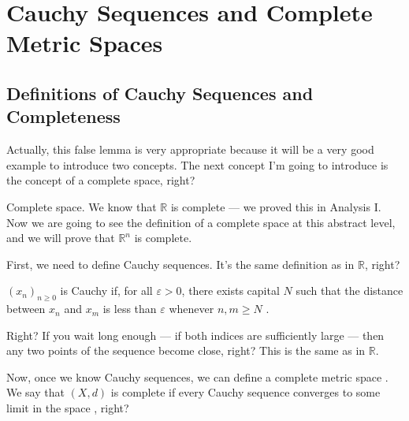 \section{Cauchy Sequences and Complete Metric Spaces}

\subsection{Definitions of Cauchy Sequences and Completeness}

\begin{speech}[00:49:59 - 00:51:39]
Actually, this false lemma is very appropriate because it will be a very good example to introduce two concepts. The next concept I'm going to introduce is the concept of a complete space, right?

Complete space. We know that $\mathbb{R}$ is complete --- we proved this in Analysis I. Now we are going to see the definition of a complete space at this abstract level, and we will prove that $\mathbb{R}^n$ is complete.

First, we need to define Cauchy sequences.  It's the same definition as in $\mathbb{R}$, right?

$(x_n)_{n \ge 0}$ is Cauchy  if, for all $\varepsilon > 0$, there exists capital $N$  such that the distance between $x_n$ and $x_m$ is less than $\varepsilon$  whenever $n, m \ge N$ .
\end{speech}

\begin{speech}[00:51:39 - 00:52:59]
Right? If you wait long enough --- if both indices are sufficiently large --- then any two points of the sequence become close, right? This is the same as in $\mathbb{R}$.

 Now, once we know Cauchy sequences, we can define a complete metric space . We say that $(X, d)$ is complete  if every Cauchy sequence  converges to some limit in the space , right?
\end{speech}

